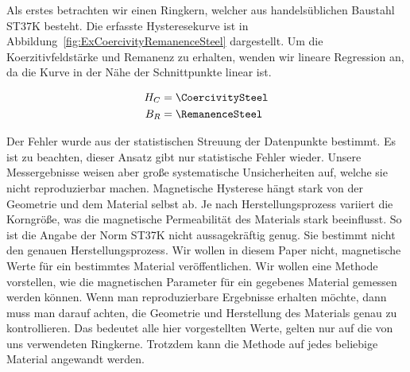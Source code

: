 \documentclass[a4paper,10pt,twocolumn]{article}
\begin{document}
    Als erstes betrachten wir einen Ringkern, welcher aus handelsüblichen Baustahl ST37K besteht. %
    Die erfasste Hysteresekurve ist in Abbildung~\ref{fig:ExCoercivityRemanenceSteel} dargestellt.
    Um die Koerzitivfeldstärke und Remanenz zu erhalten, wenden wir lineare Regression an, da die Kurve in der Nähe
    der Schnittpunkte linear ist.
    
    \begin{align*}
        H_C &= \CoercivitySteel \\
        B_R &= \RemanenceSteel
    \end{align*}
    
    Der Fehler wurde aus der statistischen Streuung der Datenpunkte bestimmt.
    Es ist zu beachten, dieser Ansatz gibt nur statistische Fehler wieder.
    Unsere Messergebnisse weisen aber große systematische Unsicherheiten auf, welche sie nicht reproduzierbar machen.
    Magnetische Hysterese hängt stark von der Geometrie und dem Material selbst ab.
    Je nach Herstellungsprozess variiert die Korngröße, was die magnetische Permeabilität des Materials stark beeinflusst.
    So ist die Angabe der Norm ST37K nicht aussagekräftig genug.
    Sie bestimmt nicht den genauen Herstellungsprozess.
    Wir wollen in diesem Paper nicht, magnetische Werte für ein bestimmtes Material veröffentlichen.
    Wir wollen eine Methode vorstellen, wie die magnetischen Parameter für ein gegebenes Material gemessen werden können.
    Wenn man reproduzierbare Ergebnisse erhalten möchte, dann muss man darauf achten, die Geometrie und Herstellung
    des Materials genau zu kontrollieren.
    Das bedeutet alle hier vorgestellten Werte, gelten nur auf die von uns verwendeten Ringkerne.
    Trotzdem kann die Methode auf jedes beliebige Material angewandt werden.
    
\end{document}
